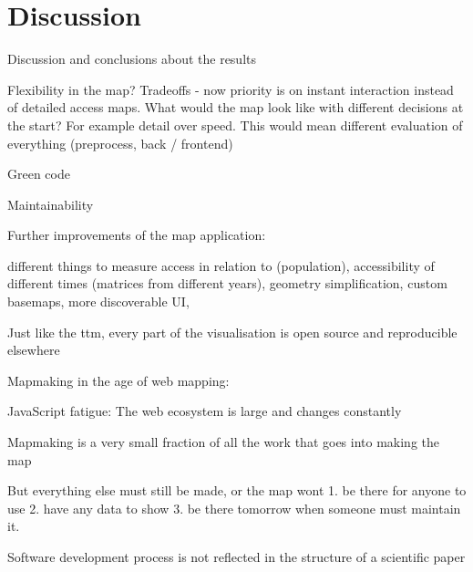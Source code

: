 \section{Discussion}

Discussion and conclusions about the results

Flexibility in the map? Tradeoffs - now priority is on instant interaction instead of detailed access maps.
What would the map look like with different decisions at the start? For example detail over speed.
This would mean different evaluation of everything (preprocess, back / frontend)

Green code

Maintainability

Further improvements of the map application:

different things to measure access in relation to (population),
accessibility of different times (matrices from different years),
geometry simplification,
custom basemaps,
more discoverable UI,

Just like the \acrshort{ttm}, every part of the visualisation is open source and reproducible elsewhere

Mapmaking in the age of web mapping:

JavaScript fatigue: The web ecosystem is large and changes constantly

Mapmaking is a very small fraction of all the work that goes into making the map

But everything else must still be made, or the map wont 1. be there for anyone to use 2. have any data to show 3. be there tomorrow when someone must maintain it.

Software development process is not reflected in the structure of a scientific paper
